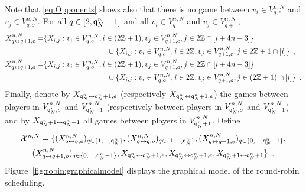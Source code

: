 Note that \eqref{eq:Opponents} shows also that there is no game between $v_i\in V_{q,e}^{n,N}$ and $v_j\in V_{q,o}^{n,N}$. For all $q\in[2,{\mathsf{q}}^{n}_{N}-1]$ and all $v_i\in V_{q}^{n,N}$ and $v_j\in V_{q+1}^{n,N}$, 
\begin{align*}
X_{q\link q+1,e}^{n,N}=&\{X_{i,j} : v_i\in V_{q,e}^{n,N},i\in(2\bZ+1),v_j\in V_{q+1,e}^{n,N},j\in 2\bZ\cap [i+4n-3]\}\\
&\hspace{3cm}\cup\{X_{i,j} : v_i\in V_{q,e}^{n,N},i\in 2\bZ,v_j\in V_{q+1,e}^{n,N},j\in 2\bZ+1\cap [i]\}\enspace,\\
X_{q\link q+1,o}^{n,N}=&\{X_{i,j} : v_i\in V_{q,o}^{n,N},i\in(2\bZ+1),v_j\in V_{q+1,o}^{n,N},j\in2\bZ\cap [i+4n-3]\}\\
&\hspace{3cm}\cup\{X_{i,j} : v_i\in V_{q,o}^{n,N},i\in2\bZ,v_j\in V_{q+1,o}^{n,N},j\in( 2\bZ+1)\cap [i]\}\enspace.
\end{align*}
Finally, denote by $X_{{\mathsf{q}}^{n}_{N}\leftrightarrow{\mathsf{q}}^{n}_{N}+1,e}$ (respectively $X_{{\mathsf{q}}^{n}_{N}\leftrightarrow{\mathsf{q}}^{n}_{N}+1,e}$) the games between players in $V_{{\mathsf{q}}^{n}_{N},e}^{n,N}$ and $V_{{\mathsf{q}}^{n}_{N}+1}^{n,N}$ (respectively between players in $V_{{\mathsf{q}}^{n}_{N},o}^{n,N}$ and $V_{{\mathsf{q}}^{n}_{N}+1}^{n,N}$) and by $X_{{\mathsf{q}}^{n}_{N}+1\leftrightarrow{\mathsf{q}}^{n}_{N}+1}$ all games between players in $V_{{\mathsf{q}}^{n}_{N}+1}^{n,N}$. Define
\begin{multline*}
\mathcal{X}^{n,N}=\{(X_{q\leftrightarrow q,e}^{n,N})_{q\in\{1,\ldots,{\mathsf{q}}^{n}_{N}\}},(X_{q\leftrightarrow q,o}^{n,N})_{q\in\{1,\ldots,{\mathsf{q}}^{n}_{N}\}},(X_{q\leftrightarrow q+1,e}^{n,N})_{q\in\{0,\ldots,{\mathsf{q}}^{n}_{N}-1\}},\\
(X_{q \leftrightarrow q+1,o}^{n,N})_{q\in\{0,\ldots,{\mathsf{q}}^{n}_{N}-1\}},X_{{\mathsf{q}}^{n}_{N}\leftrightarrow{\mathsf{q}}^{n}_{N}+1,e},X_{{\mathsf{q}}^{n}_{N}\leftrightarrow{\mathsf{q}}^{n}_{N}+1,e},X_{{\mathsf{q}}^{n}_{N}+1\leftrightarrow{\mathsf{q}}^{n}_{N}+1}\}\enspace. 
\end{multline*}
Figure~\ref{fig:robin:graphicalmodel} displays the graphical model of the round-robin scheduling.

